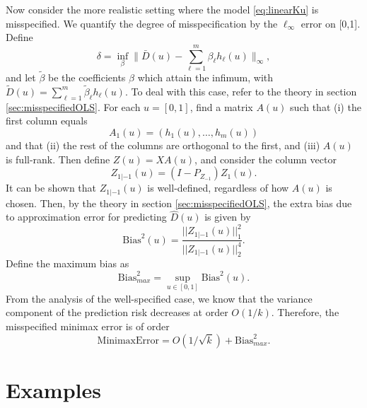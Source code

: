 Now consider the more realistic setting where the
model \eqref{eq:linearKu} is misspecified.  We quantify the degree of
misspecification by the $\ell_\infty$ error on [0,1].  Define
\[
\delta = \inf_{\beta} \|\bar{D}(u) - \sum_{\ell = 1}^m \beta_\ell h_\ell(u)\|_\infty,
\]
and let $\tilde{\beta}$ be the coefficients $\beta$ which attain the infimum,
with $\tilde{D}(u) = \sum_{\ell = 1}^m \tilde{\beta}_\ell h_\ell(u)$.
To deal with this case, refer to the theory in section \ref{sec:misspecifiedOLS}.
For each $u = [0,1]$, find a matrix $A(u)$ such that (i) the first column equals
\[
A_1(u) = (h_1(u),\hdots, h_m(u))
\]
and that (ii) the rest of the columns are orthogonal to the first,
and (iii) $A(u)$ is full-rank.
Then define $Z(u) = X A(u)$,
and consider the column vector
\[
Z_{1|-1}(u) = (I - P_{Z_{-1}}) Z_1(u).
\]
It can be shown that $Z_{1|-1}(u)$ is well-defined, regardless of how
$A(u)$ is chosen.  Then, by the theory in section \ref{sec:misspecifiedOLS},
the extra bias due to approximation error for predicting $\hat{D}(u)$
is given by
\[
\text{Bias}^2(u) = \frac{||Z_{1|-1}(u)||_1^2}{||Z_{1|-1}(u)||_2^4}.
\]
Define the maximum bias as
\[
\text{Bias}^2_{max} = \sup_{ u \in [0,1]} \text{Bias}^2(u).
\]
From the analysis of the well-specified case, we know that the
variance component of the prediction risk decreases at order $O(1/k)$.
Therefore, the misspecified minimax error is of order
\[
\text{MinimaxError} = O(1/\sqrt{k}) + \text{Bias}^2_{max}.
\]


\section{Examples}\label{sec:extrapolation_example}

